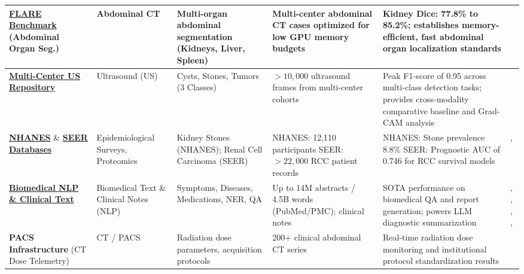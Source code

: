 \begin{longtable}{|L{2.7cm}|L{1.7cm}|L{2.4cm}|L{2.9cm}|L{3.8cm}|L{2.3cm}|}
\textbf{\href{https://flare.grand-challenge.org/Data/}{FLARE Benchmark}} \newline (Abdominal Organ Seg.) & 
Abdominal CT & 
Multi-organ abdominal segmentation (Kidneys, Liver, Spleen) & 
Multi-center abdominal CT cases optimized for low GPU memory budgets & 
Kidney Dice: 77.8\% to 85.2\%; establishes memory-efficient, fast abdominal organ localization standards & 
\cite{ma2022fast} \\
\hline

\textbf{\href{https://universe.roboflow.com/proyecto-1/tesis-iz9ji}{Multi-Center US Repository}} & 
Ultrasound (US) & 
Cysts, Stones, Tumors (3 Classes) & 
$>10,000$ ultrasound frames from multi-center cohorts & 
Peak F1-score of 0.95 across multi-class detection tasks; provides cross-modality comparative baseline and Grad-CAM analysis & 
\cite{obaid2025noisy} \\
\hline

\textbf{\href{https://www.cdc.gov/nchs/nhanes/index.htm}{NHANES}} \& \textbf{\href{https://seer.cancer.gov/}{SEER Databases}} & 
Epidemiological Surveys, Proteomics & 
Kidney Stones (NHANES); Renal Cell Carcinoma (SEER) & 
NHANES: 12,110 participants \newline SEER: $>22,000$ RCC patient records & 
NHANES: Stone prevalence 8.8\% \newline SEER: Prognostic AUC of 0.746 for RCC survival models & 
\cite{scales2012prevalence}, \cite{wang2022web} \\
\hline

\textbf{\href{https://huggingface.co/datasets/ncbi/pubmed}{Biomedical NLP \& Clinical Text}} & 
Biomedical Text \& Clinical Notes (NLP) & 
Symptoms, Diseases, Medications, NER, QA & 
Up to 14M abstracts / 4.5B words (PubMed/PMC); clinical notes & 
SOTA performance on biomedical QA and report generation; powers LLM diagnostic summarization & 
\cite{gu2021domain}, \cite{lee_biobert}, \cite{fang2023bioformer}, \cite{luo2022biogpt}, \cite{liu2024bootstrapping} \\
\hline

\textbf{PACS Infrastructure} \newline (CT Dose Telemetry) & 
CT / PACS & 
Radiation dose parameters, acquisition protocols & 
200+ clinical abdominal CT series & 
Real-time radiation dose monitoring and institutional protocol standardization results & 
\cite{noorelahi2025role} \\
\hline


\end{longtable}
